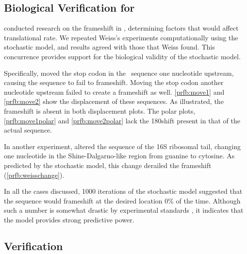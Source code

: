 \documentclass[12pt]{article}
\numberwithin{equation}{section}
\begin{document}

\subsection{Biological Verification for \prfB}

\citet{weiss87,weiss88} conducted research on the
frameshift in \prfB, determining factors that would affect
translational rate.  We repeated Weiss's experiments computationally
using the stochastic model, and results agreed with those that Weiss found.
This concurrence provides support for the biological validity of
the stochastic model.


Specifically, \citeauthor{weiss87} moved the stop codon in the
\prfB\ sequence one nucleotide upstream, causing the sequence to fail to
frameshift. Moving the stop codon another nucleotide upstream failed
to create a frameshift as well. \autoref{prfb:move1} and \autoref{prfb:move2}
show the displacement of these sequences.  As illustrated,
the frameshift is absent in both displacement plots.  The polar
plots, \autoref{prfb:move1polar} and \autoref{prfb:move2polar}
lack the 180\degree shift present in that of the actual sequence.

In another experiment, \citeauthor{weiss88} altered the sequence of the
16S ribosomal tail, changing one nucleotide in the Shine-Dalgarno-like region
from guanine to cytosine.  As predicted by the stochastic model, this
change derailed the frameshift (\autoref{prfb:weisschange}).

In all the cases discussed, 1000 iterations of the stochastic model
suggested that the sequence would frameshift at the desired location 0\%
of the time.  Although such a number is somewhat drastic by experimental
standards \cite{weiss87,weiss88}, it indicates that the model provides
strong predictive power.



\subsection{Verification}
\end{document}
